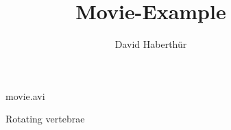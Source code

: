 \documentclass[paper=a4]{scrartcl}
\title{Movie-Example}
\author{David Haberthür}
\begin{document}
\maketitle
\begin{figure}[htb]%
\centering%
  {movie.avi}%
\caption{Rotating vertebrae}%
\label{mov:vertebrae}%
\end{figure}%
\end{document}
